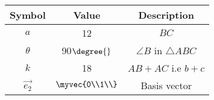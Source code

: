 \begin{tabular}{|c|c|c|}
  \hline
  \textbf{Symbol}&\textbf{Value}&\textbf{Description}\\
  \hline
  $a$ & 12 & $BC$\\
  \hline
	$\theta$ & 90$\degree{}$ & $\angle{B}$ in $\triangle ABC$ \\
  \hline
  $k$ & 18 & $AB+AC$ i.e $b+c$ \\
  \hline 
  $\vec{e_2}$ & $\myvec{0\\1\\}$ & Basis vector\\
  \hline   
\end{tabular}\\

